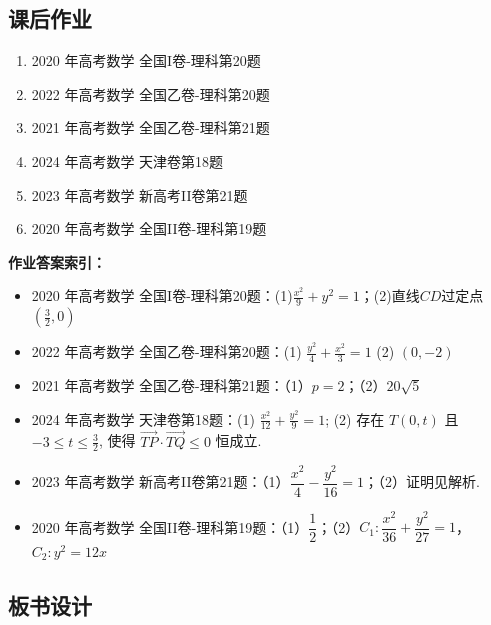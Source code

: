\documentclass[UTF8,a4paper,11pt]{ctexart}
\begin{document}
\subsection*{课后作业}

\begin{enumerate}

\item 2020 年高考数学 全国I卷-理科第20题

\item 2022 年高考数学 全国乙卷-理科第20题

\item 2021 年高考数学 全国乙卷-理科第21题

\item 2024 年高考数学 天津卷第18题

\item 2023 年高考数学 新高考II卷第21题

\item 2020 年高考数学 全国II卷-理科第19题

\end{enumerate}

\noindent\textbf{作业答案索引：}

\begin{itemize}

\item 2020 年高考数学 全国I卷-理科第20题：(1)$\frac{x^2}{9}+y^2=1$；(2)直线$CD$过定点$\left(\frac{3}{2},0\right)$

\item 2022 年高考数学 全国乙卷-理科第20题：(1) $\frac{y^2}{4}+\frac{x^2}{3}=1$
(2) $(0,-2)$

\item 2021 年高考数学 全国乙卷-理科第21题：（1）$p=2$；（2）$20\sqrt{5}$

\item 2024 年高考数学 天津卷第18题：(1) $\frac{x^2}{12}+\frac{y^2}{9}=1$; (2) 存在 $T(0,t)$ 且 $-3\leq t\leq \frac{3}{2}$, 使得 $\overrightarrow{TP}\cdot\overrightarrow{TQ}\leq 0$ 恒成立.

\item 2023 年高考数学 新高考II卷第21题：（1）$\dfrac{x^{2}}{4}-\dfrac{y^{2}}{16}=1$；（2）证明见解析.

\item 2020 年高考数学 全国II卷-理科第19题：（1）$\dfrac12$；（2）$C_1:\dfrac{x^2}{36}+\dfrac{y^2}{27}=1$，$C_2:y^2=12x$

\end{itemize}

\subsection*{板书设计}
\end{document}
